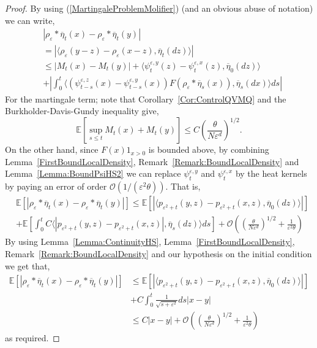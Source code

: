 \documentclass[a4paper,12pt]{article}
\newcommand{\EE}{\mathbb{E}}
\newcommand{\1}{{\bf {1}}}
\def\epsilon{\varepsilon}
\begin{document}
\begin{proof}
By using (\ref{MartingaleProblemMolifier}) (and an obvious abuse of notation) we can write,
\begin{align}
& |\rho_\epsilon*\overline{\eta}_t(x)-\rho_\epsilon*\overline{\eta}_t(y)| \nonumber \\ &= |\langle \rho_\epsilon(y-z)-\rho_\epsilon(x-z),\overline{\eta}_t(dz) \rangle | \nonumber\\ &\leq  |M_t(x)-M_t(y)|  +\langle \psi_t^{\epsilon,y}(z)-\psi_t^{\epsilon,x}(z), \overline{\eta}_0(dz)\rangle \nonumber \\ &+ |\int_0^t \langle (\psi_{t-s}^{\epsilon,z}(x) - \psi_{t-s}^{\epsilon, y}(x) )F(\rho_\epsilon*\overline{\eta}_s(x)), \overline{\eta}_s(dx) \rangle  ds |  \label{eq:bound1CE} \end{align} 
For the martingale term; note that Corollary~\ref{Cor:ControlQVMQ} and the Burkholder-Davis-Gundy inequality give,
\[
\EE[\sup_{s \leq t} M_t(x) + M_t(y)] \leq C\left(\frac{\theta}{N \epsilon^d}\right)^{1/2}. \]
On the other hand, since $F(x)1_{x >0}$ is bounded above, by combining Lemma~\ref{FirstBoundLocalDensity}, Remark~\ref{Remark:BoundLocalDensity} and Lemma~\ref{Lemma:BoundPsiHS2} we can replace $\psi_t^{\epsilon, y}$ and $\psi_t^{\epsilon,x}$ by the heat kernels by paying an error of order $\mathcal{O}(1/(\epsilon^2\theta))$. That is, 
\begin{align*}
&\EE\left[|\rho_\epsilon*\overline{\eta}_t(x)-\rho_\epsilon*\overline{\eta}_t(y)| \right] \leq \EE[|\langle p_{\epsilon^2+t}(y,z)-p_{\epsilon^2+t}(x,z),\overline{\eta}_0(dz)\rangle|]  \\ &+\mathbb{E}\left[ \int_0^t C \langle |p_{\epsilon^2+t}(y,z)-p_{\epsilon^2+t}(x,z)|,\overline{\eta}_s(dz)\rangle ds \right]+ \mathcal{O}\left( \left( \frac{\theta}{N \epsilon^d}\right)^{1/2} + \frac{1}{\epsilon^2 \theta} \right)\end{align*}
By using Lemma~\ref{Lemma:ContinuityHS}, Lemma~\ref{FirstBoundLocalDensity}, Remark~\ref{Remark:BoundLocalDensity} and our hypothesis on the initial condition we get that,
\begin{align*}
\EE\left[|\rho_\epsilon*\overline{\eta}_t(x)-\rho_\epsilon*\overline{\eta}_t(y)| \right] &\leq \EE[|\langle p_{\epsilon^2+t}(y,z)-p_{\epsilon^2+t}(x,z),\overline{\eta}_0(dz)\rangle|] \\ & + C \int_0^t \frac{1}{\sqrt{s+\epsilon^2}} ds |x-y| \\ &\leq C|x-y| +\mathcal{O}\left( \left( \frac{\theta}{N \epsilon^d}\right)^{1/2} + \frac{1}{\epsilon^2 \theta} \right)
\end{align*}
as required.
\end{proof}
\end{document}
